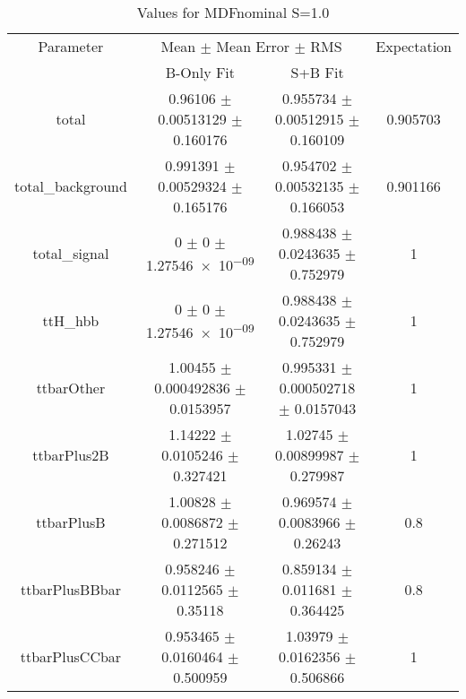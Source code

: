 \begin{table}
\centering
\caption{Values for MDFnominal S=1.0}
\begin{tabular}{cccc}
\toprule
Parameter & \multicolumn{2}{c}{Mean $\pm$ Mean Error $\pm$ RMS} & Expectation\\
 & B-Only Fit & S+B Fit & \\
\midrule
total & \num{0.96106} $\pm$ \num{0.00513129} $\pm$ \num{0.160176} & \num{0.955734} $\pm$ \num{0.00512915} $\pm$ \num{0.160109} & \num{0.905703}\\
total\_background & \num{0.991391} $\pm$ \num{0.00529324} $\pm$ \num{0.165176} & \num{0.954702} $\pm$ \num{0.00532135} $\pm$ \num{0.166053} & \num{0.901166}\\
total\_signal & \num{0} $\pm$ \num{0} $\pm$ \num{1.27546e-09} & \num{0.988438} $\pm$ \num{0.0243635} $\pm$ \num{0.752979} & \num{1}\\
ttH\_hbb & \num{0} $\pm$ \num{0} $\pm$ \num{1.27546e-09} & \num{0.988438} $\pm$ \num{0.0243635} $\pm$ \num{0.752979} & \num{1}\\
ttbarOther & \num{1.00455} $\pm$ \num{0.000492836} $\pm$ \num{0.0153957} & \num{0.995331} $\pm$ \num{0.000502718} $\pm$ \num{0.0157043} & \num{1}\\
ttbarPlus2B & \num{1.14222} $\pm$ \num{0.0105246} $\pm$ \num{0.327421} & \num{1.02745} $\pm$ \num{0.00899987} $\pm$ \num{0.279987} & \num{1}\\
ttbarPlusB & \num{1.00828} $\pm$ \num{0.0086872} $\pm$ \num{0.271512} & \num{0.969574} $\pm$ \num{0.0083966} $\pm$ \num{0.26243} & \num{0.8}\\
ttbarPlusBBbar & \num{0.958246} $\pm$ \num{0.0112565} $\pm$ \num{0.35118} & \num{0.859134} $\pm$ \num{0.011681} $\pm$ \num{0.364425} & \num{0.8}\\
ttbarPlusCCbar & \num{0.953465} $\pm$ \num{0.0160464} $\pm$ \num{0.500959} & \num{1.03979} $\pm$ \num{0.0162356} $\pm$ \num{0.506866} & \num{1}\\
\bottomrule
\end{tabular}
\end{table}